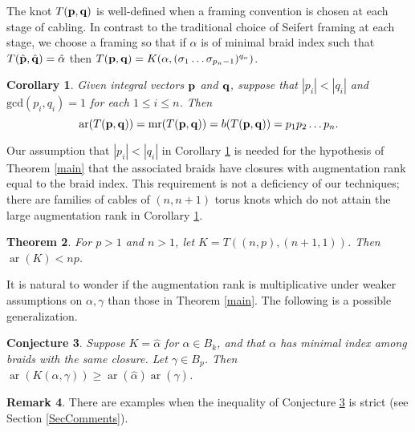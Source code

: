 \documentclass[11pt]{amsart}
\def\s{{\sigma}}
\def\ar{\operatorname{ar}}
\def\mr{\operatorname{mr}}
\def\fp{{\scriptstyle \bar{\bar{p}}}}
\newtheorem{thm}{Theorem}[section]
\newtheorem{cor}[thm]{Corollary}
\newtheorem{conj}[thm]{Conjecture}
\theoremstyle{definition}
\newtheorem{rem}[thm]{Remark}
\begin{document}
The knot $T({\bf p},{\bf q})$ is well-defined when a framing convention is chosen at each stage of cabling. In contrast to the traditional choice of Seifert framing at each stage, we choose a framing so that if $\alpha$ is of minimal braid index such that $T(\hat{\bf p},\hat{\bf q}) = \hat{\alpha}$ then $T({\bf p},{\bf q}) = K(\alpha,(\s_1\ldots\s_{p_n-1})^{q_n})$.

\begin{cor}\label{cor:iteratedCables}
Given integral vectors ${\bf p}$ and ${\bf q}$, suppose that $|p_i|<|q_i|$ and $\text{gcd}(p_i,q_i)=1$ for each $1\le i\le n$. Then 
      \[\ar(T({\bf p},{\bf q}))=\mr(T({\bf p},{\bf q})) = b(T({\bf p},{\bf q}))=p_1p_2\ldots p_n.\]
\end{cor}

Our assumption that $|p_i|<|q_i|$ in Corollary \ref{cor:iteratedCables} is needed for the hypothesis of Theorem \ref{main} that the associated braids have closures with augmentation rank equal to the braid index. This requirement is not a deficiency of our techniques; there are families of cables of $(n,n+1)$ torus knots which do not attain the large augmentation rank in Corollary \ref{cor:iteratedCables}.

\begin{thm}\label{ThmNNPlus1}For $p>1$ and $n>1$, let $K=T((n,p),(n+1,1))$. Then $\ar(K) < np$.
\end{thm}

It is natural to wonder if the augmentation rank is multiplicative under weaker assumptions on $\alpha, \gamma$ than those in Theorem \ref{main}. The following is a possible generalization.

\begin{conj}Suppose $K=\hat{\alpha}$ for $\alpha\in B_k$, and that $\alpha$ has minimal index among braids with the same closure. Let $\gamma\in B_p$. Then $\ar(K(\alpha,\gamma)) \ge \ar(\hat{\alpha})\ar(\hat{\gamma})$.
\label{ConjSuperMultipl}
\end{conj}

\begin{rem}There are examples when the inequality of Conjecture \ref{ConjSuperMultipl} is strict (see Section \ref{SecComments}).
\label{RemStrictlySuper}
\end{rem}

\end{document}
